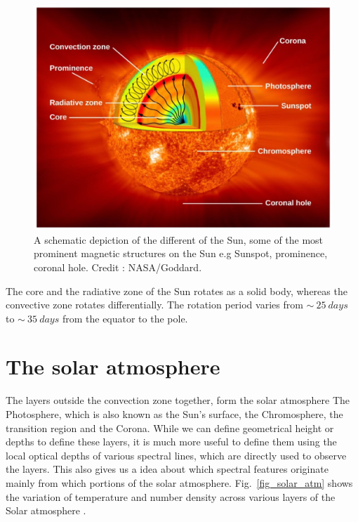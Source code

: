 \begin{figure}[ht!]
    \centering
    \includegraphics[width = 0.8\linewidth]{Figures/solar_int.png}
    \caption{A schematic depiction of the different  of the Sun,  some of the most prominent magnetic structures on the Sun e.g Sunspot, prominence, coronal hole. Credit : NASA/Goddard.}
    \label{fig_solar_int}
\end{figure}

The core and the radiative zone of the Sun rotates as a solid body, whereas the convective zone rotates differentially. The rotation period varies from $\sim~25~days$ to $\sim~35~days$ from the equator to the pole.

\section{The solar atmosphere}\label{solar_atmos}

The layers outside the convection zone together, form the solar atmosphere The Photosphere, which is also known as the Sun's surface, the Chromosphere, the transition region and the Corona. While we can define geometrical height or depths to define these layers, it is much more useful to define them using the local optical depths of various spectral lines, which are directly used to observe the layers. This also gives us a idea about which spectral features originate mainly from which portions of the solar atmosphere. Fig.~\ref{fig_solar_atm} shows the variation of temperature and number density across various layers of the Solar atmosphere .

